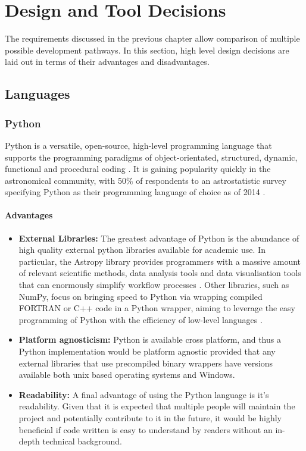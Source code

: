 \documentclass[titlesmallcaps, examinerscopy, copyrightpage]{uqthesis}
\begin{document}
\chapter{Design and Tool Decisions}
\label{ch:design}

The requirements discussed in the previous chapter allow comparison of multiple possible development pathways. In this section, high level design decisions are laid out in terms of their advantages and disadvantages. 

\section{Languages}

\subsection{Python}

Python is a versatile, open-source, high-level programming language that supports the programming paradigms of object-orientated, structured, dynamic, functional and procedural coding \cite{Python}. It is gaining popularity quickly in the astronomical community, with 50\% of respondents to an astrostatistic survey specifying Python as their programming language of choice as of 2014 \cite{PythonPop}.

\subsubsection{Advantages}

\begin{itemize}
\item \textbf{External Libraries:} The greatest advantage of Python is the abundance of  high quality external python libraries available for academic use. In particular, the Astropy library provides programmers with a massive amount of relevant scientific methods, data analysis tools and data visualisation tools that can enormously simplify workflow processes \cite{astropy}. Other libraries, such as NumPy, focus on bringing speed to Python via wrapping compiled FORTRAN or C++ code in a Python wrapper, aiming to leverage the easy programming of Python with the efficiency of low-level languages \cite{numpy}.

\item \textbf{Platform agnosticism:} Python is available cross platform, and thus a Python implementation would be platform agnostic provided that any external libraries that use precompiled binary wrappers have versions available both unix based operating systems and Windows.

\item \textbf{Readability:} A final advantage of using the Python language is it's readability. Given that it is expected that multiple people will maintain the project and potentially contribute to it in the future, it would be highly beneficial if code written is easy to understand by readers without an in-depth technical background.
\end{itemize}
  
\end{document}
